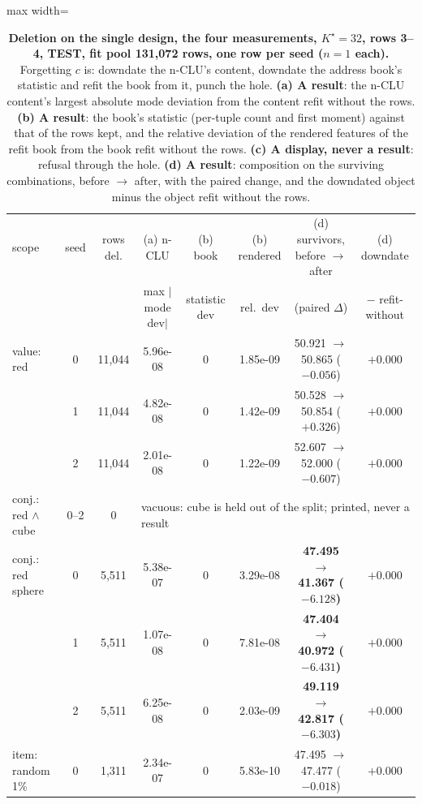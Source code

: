 \documentclass{article} %
\newcommand{\Kstar}{\ensuremath{K^{\star}}}
\begin{document}
\begin{table}[t]
\centering\small
\caption{\textbf{Deletion on the single design, the four measurements, $\Kstar=32$, rows 3--4, TEST, fit %
pool 131,072 rows, one row per seed ($n=1$ each).} Forgetting $c$ is: downdate the n-CLU's content, downdate %
the address book's statistic and refit the book from it, punch the hole. \textbf{(a) A result}: the
n-CLU content's largest absolute mode deviation from the content refit without the rows. \textbf{(b) A
result}: the book's statistic (per-tuple count and first moment) against that of the rows kept, and
the relative deviation of the rendered features of the refit book from the book refit without the
rows. \textbf{(c) A display, never a result}: refusal through the hole. \textbf{(d) A result}:
composition on the surviving combinations, before $\to$ after, with the paired change, and the downdated
object minus the object refit without the rows.}
\label{tab:del}
\setlength{\tabcolsep}{2.6pt}
\begin{adjustbox}{max width=\linewidth}\begin{tabular}{lccccccc}
\toprule
scope & seed & rows del. & (a) n-CLU & (b) book & (b) rendered & (d) survivors, before $\to$ after & (d) downdate \\
 & & & max $|$mode dev$|$ & statistic dev & rel.\ dev & (paired $\Delta$) & $-$ refit-without \\
\midrule
value: red & 0 & 11,044 & 5.96e-08 & 0 & 1.85e-09 & 50.921 $\to$ 50.865 ($-0.056$) & $+0.000$ \\
 & 1 & 11,044 & 4.82e-08 & 0 & 1.42e-09 & 50.528 $\to$ 50.854 ($+0.326$) & $+0.000$ \\
 & 2 & 11,044 & 2.01e-08 & 0 & 1.22e-09 & 52.607 $\to$ 52.000 ($-0.607$) & $+0.000$ \\
conj.: red $\wedge$ cube & 0--2 & 0 & \multicolumn{5}{l}{vacuous: cube is held out of the split; printed, never a result} \\
conj.: red sphere & 0 & 5,511 & 5.38e-07 & 0 & 3.29e-08 & \textbf{47.495 $\to$ 41.367 ($-6.128$)} & $+0.000$ \\
 & 1 & 5,511 & 1.07e-08 & 0 & 7.81e-08 & \textbf{47.404 $\to$ 40.972 ($-6.431$)} & $+0.000$ \\
 & 2 & 5,511 & 6.25e-08 & 0 & 2.03e-09 & \textbf{49.119 $\to$ 42.817 ($-6.303$)} & $+0.000$ \\
item: random 1\% & 0 & 1,311 & 2.34e-07 & 0 & 5.83e-10 & 47.495 $\to$ 47.477 ($-0.018$) & $+0.000$ \\

\end{tabular}
\end{adjustbox}
\end{table}
\end{document}
